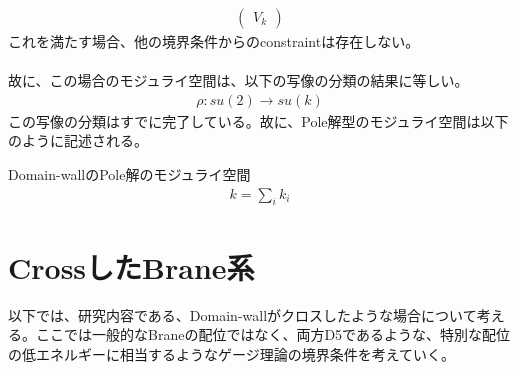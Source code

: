 \documentclass[dvipdfmx,a4paper,10.5pt]{article}
\numberwithin{equation}{section}
\begin{document}
\begin{enumerate}
\begin{align*}
\begin{pmatrix}
            V_{k}
        \end{pmatrix}
    \end{align*}
    これを満たす場合、他の境界条件からのconstraintは存在しない。\\
    \\
    故に、この場合のモジュライ空間は、以下の写像の分類の結果に等しい。
    \begin{align*}
        \rho:su(2)\to su(k)
    \end{align*}
    この写像の分類はすでに完了している。故に、Pole解型のモジュライ空間は以下のように記述される。
    \begin{resultbox}{Domain-wallのPole解のモジュライ空間}
        \begin{align*}
        k=\sum_{i}k_{i}
    \end{align*}
    \end{resultbox}
\end{enumerate}

\section{CrossしたBrane系}
以下では、研究内容である、Domain-wallがクロスしたような場合について考える。ここでは一般的なBraneの配位ではなく、両方D5であるような、特別な配位の低エネルギーに相当するようなゲージ理論の境界条件を考えていく。
\end{document}

